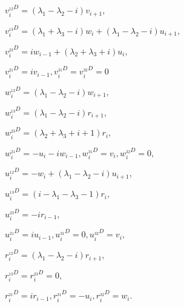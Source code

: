 $ v_i^{_{12}D} = (\lambda_1 - \lambda_2 - i)v_{i + 1}, $

$ v_i^{_{13}D} = (\lambda_1 + \lambda_3 - i)w_i + (\lambda_1 - \lambda_2 - i)u_{i + 1}, $

$ v_i^{_{23}D} = i w_{i - 1} + (\lambda_2 + \lambda_3 + i)u_i, $

$ v_i^{_{21}D} = i v_{i - 1}, v_i^{_{31}D} = v_i^{_{32}D} = 0 $
\newline

$ w_i^{_{12}D} = (\lambda_1 - \lambda_2 - i)w_{i + 1}, $

$ w_i^{_{13}D} = (\lambda_1 - \lambda_2 - i)r_{i + 1}, $

$ w_i^{_{23}D} = (\lambda_2 + \lambda_3 + i + 1)r_i, $

$ w_i^{_{21}D} = -u_i - i w_{i - 1}, w_i^{_{31}D} = v_i, w_i^{_{32}D} = 0, $
\newline

$ u_i^{_{12}D} = - w_i + (\lambda_1 - \lambda_2 - i)u_{i + 1}, $

$ u_i^{_{13}D} = (i - \lambda_1 - \lambda_3 - 1)r_i, $

$ u_i^{_{23}D} = -i r_{i - 1}, $

$ u_i^{_{21}D} = i u_{i - 1}, u_i^{_{31}D} = 0, u_i^{_{32}D} = v_i, $
\newline

$ r_i^{_{12}D} = (\lambda_1 - \lambda_2 - i)r_{i + 1}, $

$ r_i^{_{13}D} = r_i^{_{23}D} = 0, $

$ r_i^{_{21}D} = i r_{i - 1}, r_i^{_{31}D} = -u_i, r_i^{_{32}D} = w_i. $
